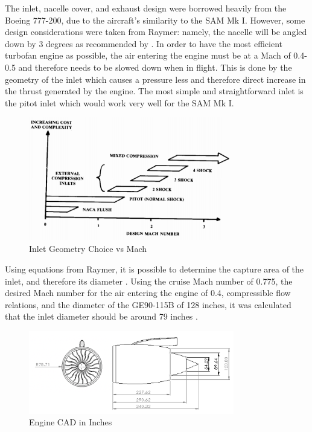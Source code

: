 The inlet, nacelle cover, and exhaust design were borrowed heavily from the Boeing 777-200, due to the aircraft's similarity to the SAM Mk I. However, some design considerations were taken from Raymer: namely, the nacelle will be angled down by 3 degrees as recommended by \cite{raymer}. In order to have the most efficient turbofan engine as possible, the air entering the engine must be at a Mach of 0.4-0.5 and therefore needs to be slowed down when in flight. This is done by the geometry of the inlet which causes a pressure less and therefore direct increase in the thrust generated by the engine.  The most simple and straightforward inlet is the pitot inlet which would work very well for the SAM Mk I.

\begin{figure} [h!]
    \centering
    \includegraphics[width=0.8\textwidth]{Photos/inletapplicability.PNG}
    \caption{Inlet Geometry Choice vs Mach}
    \label{fig:inlet}
\end{figure}

Using equations from Raymer, it is possible to determine the capture area of the inlet, and therefore its diameter \cite{raymer}. Using the cruise Mach number of 0.775, the desired Mach number for the air entering the engine of 0.4, compressible flow relations, and the diameter of the GE90-115B of 128 inches, it was calculated that the inlet diameter should be around 79 inches \cite{ge}.

\begin{figure} [h!]
    \centering
    \includegraphics[width=0.8\textwidth]{Photos/propulsion/enginecad.png}
    \caption{Engine CAD in Inches}
    \label{fig:enginecad}
\end{figure}

